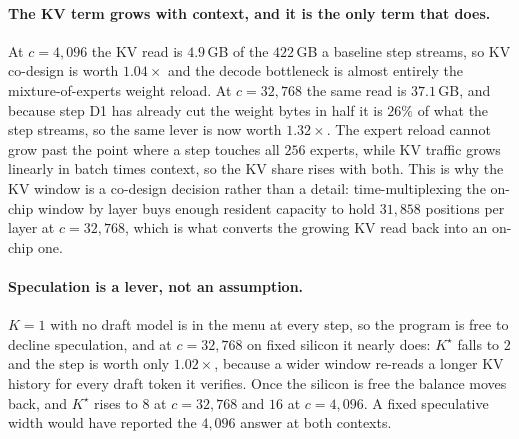 \paragraph{The KV term grows with context, and it is the only term that does.}
At $c=4{,}096$ the KV read is $4.9$\,GB of the $422$\,GB a baseline step
streams, so KV co-design is worth $1.04\times$ and the decode bottleneck is
almost entirely the mixture-of-experts weight reload. At $c=32{,}768$ the same
read is $37.1$\,GB, and because step D1 has already cut the weight bytes in
half it is $26\%$ of what the step streams, so the same lever is now worth
$1.32\times$. The expert reload cannot grow past the point where a step touches
all $256$ experts, while KV traffic grows linearly in batch times context, so
the KV share rises with both. This is why the KV window is a co-design decision
rather than a detail: time-multiplexing the on-chip window by layer buys enough
resident capacity to hold $31{,}858$ positions per layer at $c=32{,}768$, which
is what converts the growing KV read back into an on-chip one.

\paragraph{Speculation is a lever, not an assumption.}
$K{=}1$ with no draft model is in the menu at every step, so the program is free
to decline speculation, and at $c=32{,}768$ on fixed silicon it nearly does:
$K^\star$ falls to $2$ and the step is worth only $1.02\times$, because a wider
window re-reads a longer KV history for every draft token it verifies. Once the
silicon is free the balance moves back, and $K^\star$ rises to $8$ at
$c=32{,}768$ and $16$ at $c=4{,}096$. A fixed speculative width would have
reported the $4{,}096$ answer at both contexts.
